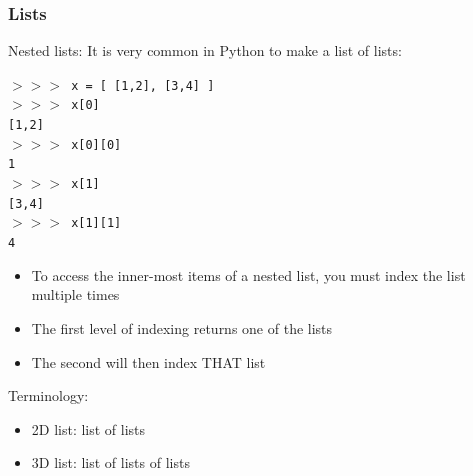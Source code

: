 \documentclass{beamer}
\newcommand{\code}[1]{\texttt{#1}}
\newcommand{\shp}{$>>>$ }
\begin{document}
\begin{frame}
	\frametitle{Lists}
	
	\begin{block}{Nested lists:}
		It is very common in Python to make a list of lists:
		
		\vspace{10pt}
			\code{\shp x = [ [1,2], [3,4] ] \\
			\shp x[0] \\ \hspace{0pt}
			[1,2] \\
			\shp x[0][0] \\
			1 \\
			\shp x[1] \\ \hspace{0pt}
			[3,4] \\
			\shp x[1][1] \\
			4
			}
		\endminipage\hfill
			\begin{itemize}
				\item To access the inner-most items of a nested list, you must index the list multiple times
				\item The first level of indexing returns one of the lists
				\item The second will then index THAT list
			\end{itemize}
		\endminipage\hfill
		
		\vspace{15pt}
		Terminology:
		\begin{itemize}
			\item 2D list: list of lists
			\item 3D list: list of lists of lists
		\end{itemize}
	\end{block}
\end{frame}
\end{document}
